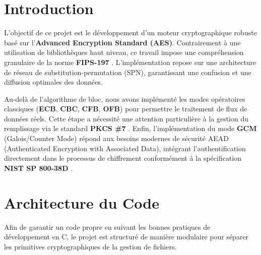 \documentclass[12pt,a4paper]{article}
\begin{document}
\newpage
\tableofcontents
\newpage

\section{Introduction}
L'objectif de ce projet est le développement d'un moteur cryptographique robuste basé sur l'\textbf{Advanced Encryption Standard (AES)}. Contrairement à une utilisation de bibliothèques haut niveau, ce travail impose une compréhension granulaire de la norme \textbf{FIPS-197} \cite{fips197}. L'implémentation repose sur une architecture de réseau de substitution-permutation (SPN), garantissant une confusion et une diffusion optimales des données.

Au-delà de l'algorithme de bloc, nous avons implémenté les modes opératoires classiques (\textbf{ECB}, \textbf{CBC}, \textbf{CFB}, \textbf{OFB}) pour permettre le traitement de flux de données réels. Cette étape a nécessité une attention particulière à la gestion du remplissage via le standard \textbf{PKCS \#7} \cite{rfc2315}. Enfin, l'implémentation du mode \textbf{GCM} (Galois/Counter Mode) répond aux besoins modernes de sécurité AEAD (Authenticated Encryption with Associated Data), intégrant l'authentification directement dans le processus de chiffrement conformément à la spécification \textbf{NIST SP 800-38D} \cite{sp80038d}.

\section{Architecture du Code}
Afin de garantir un code propre en suivant les bonnes pratiques de développement en C, le projet est structuré de manière modulaire pour séparer les primitives cryptographiques de la gestion de fichiers.\\
\end{document}
